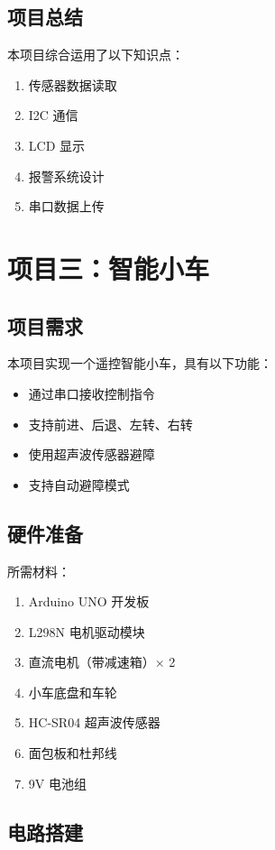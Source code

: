 \documentclass[12pt,UTF8]{ctexbook}
\begin{document}
\section{项目总结}

本项目综合运用了以下知识点：
\begin{enumerate}
    \item 传感器数据读取
    \item I2C 通信
    \item LCD 显示
    \item 报警系统设计
    \item 串口数据上传
\end{enumerate}

\chapter{项目三：智能小车}

\section{项目需求}

本项目实现一个遥控智能小车，具有以下功能：
\begin{itemize}
    \item 通过串口接收控制指令
    \item 支持前进、后退、左转、右转
    \item 使用超声波传感器避障
    \item 支持自动避障模式
\end{itemize}

\section{硬件准备}

所需材料：
\begin{enumerate}
    \item Arduino UNO 开发板
    \item L298N 电机驱动模块
    \item 直流电机（带减速箱）× 2
    \item 小车底盘和车轮
    \item HC-SR04 超声波传感器
    \item 面包板和杜邦线
    \item 9V 电池组
\end{enumerate}

\section{电路搭建}
\end{document}
